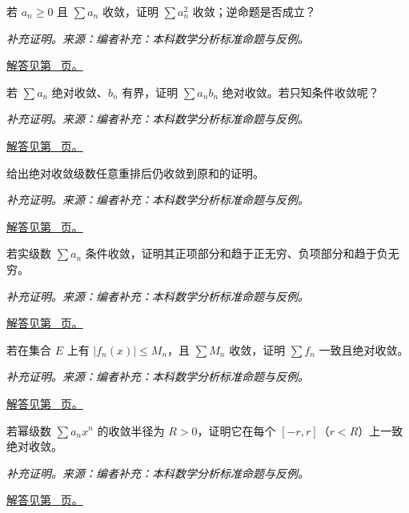 \documentclass[UTF8,12pt,a4paper,fontset=fandol]{ctexart}
\begin{document}
\begin{example}[正项收敛与平方级数]\label{ex:c29q7}
若 $a_n\ge0$ 且 $\sum a_n$ 收敛，证明 $\sum a_n^2$ 收敛；逆命题是否成立？
\par\textit{补充证明。来源：编者补充：本科数学分析标准命题与反例。}\par\hyperref[ans:c29q7]{解答见第~\pageref{ans:c29q7} 页。}
\end{example}
\begin{example}[收敛级数乘有界因子]\label{ex:c29q8}
若 $\sum a_n$ 绝对收敛、$b_n$ 有界，证明 $\sum a_nb_n$ 绝对收敛。若只知条件收敛呢？
\par\textit{补充证明。来源：编者补充：本科数学分析标准命题与反例。}\par\hyperref[ans:c29q8]{解答见第~\pageref{ans:c29q8} 页。}
\end{example}
\begin{example}[绝对收敛级数的重排]\label{ex:c29q9}
给出绝对收敛级数任意重排后仍收敛到原和的证明。
\par\textit{补充证明。来源：编者补充：本科数学分析标准命题与反例。}\par\hyperref[ans:c29q9]{解答见第~\pageref{ans:c29q9} 页。}
\end{example}
\begin{example}[条件收敛级数的正负部分]\label{ex:c29q10}
若实级数 $\sum a_n$ 条件收敛，证明其正项部分和趋于正无穷、负项部分和趋于负无穷。
\par\textit{补充证明。来源：编者补充：本科数学分析标准命题与反例。}\par\hyperref[ans:c29q10]{解答见第~\pageref{ans:c29q10} 页。}
\end{example}
\begin{example}[Weierstrass 判别]\label{ex:c29q11}
若在集合 $E$ 上有 $|f_n(x)|\le M_n$，且 $\sum M_n$ 收敛，证明 $\sum f_n$ 一致且绝对收敛。
\par\textit{补充证明。来源：编者补充：本科数学分析标准命题与反例。}\par\hyperref[ans:c29q11]{解答见第~\pageref{ans:c29q11} 页。}
\end{example}
\begin{example}[幂级数在小闭区间上一致收敛]\label{ex:c29q12}
若幂级数 $\sum a_nx^n$ 的收敛半径为 $R>0$，证明它在每个 $[-r,r]$（$r<R$）上一致绝对收敛。
\par\textit{补充证明。来源：编者补充：本科数学分析标准命题与反例。}\par\hyperref[ans:c29q12]{解答见第~\pageref{ans:c29q12} 页。}
\end{example}
\end{document}
